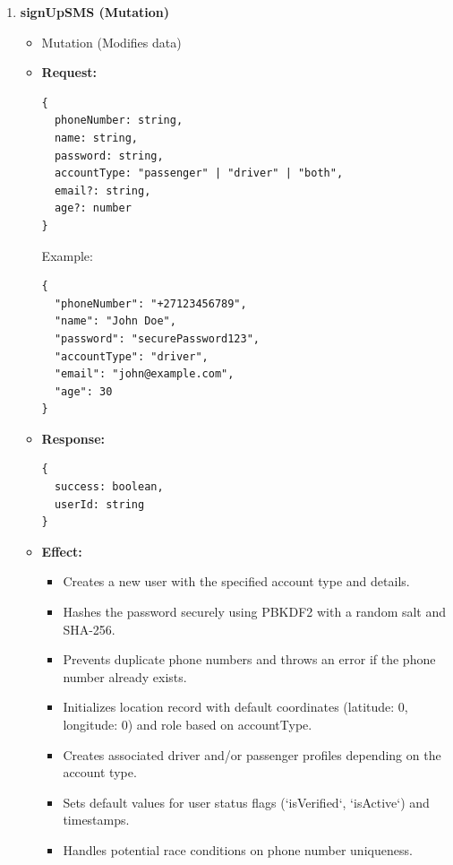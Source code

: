 \documentclass[a4paper,12pt]{article}
\begin{document}
\begin{enumerate}
\item \textbf{signUpSMS (Mutation)}
    \begin{itemize}
      \item Mutation (Modifies data)
      \item \textbf{Request:}
      \begin{verbatim}
{
  phoneNumber: string,
  name: string,
  password: string,
  accountType: "passenger" | "driver" | "both",
  email?: string,
  age?: number
}
      \end{verbatim}
      Example:
      \begin{verbatim}
{
  "phoneNumber": "+27123456789",
  "name": "John Doe",
  "password": "securePassword123",
  "accountType": "driver",
  "email": "john@example.com",
  "age": 30
}
      \end{verbatim}
      \item \textbf{Response:}
      \begin{verbatim}
{
  success: boolean,
  userId: string
}
      \end{verbatim}
      \item \textbf{Effect:}
      \begin{itemize}
        \item Creates a new user with the specified account type and details.
        \item Hashes the password securely using PBKDF2 with a random salt and SHA-256.
        \item Prevents duplicate phone numbers and throws an error if the phone number already exists.
        \item Initializes location record with default coordinates (latitude: 0, longitude: 0) and role based on accountType.
        \item Creates associated driver and/or passenger profiles depending on the account type.
        \item Sets default values for user status flags (`isVerified`, `isActive`) and timestamps.
        \item Handles potential race conditions on phone number uniqueness.
      \end{itemize}
    \end{itemize}


\end{enumerate}
\end{document}
